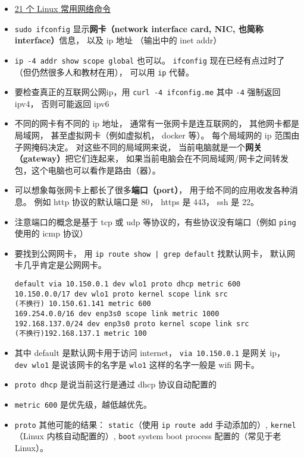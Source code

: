 
\begin{itemize}
\item \href{https://itsfoss.com/basic-linux-networking-commands/}{21 个 Linux 常用网络命令}
\item \verb`sudo ifconfig` 显示\textbf{网卡（network interface card, NIC, 也简称 interface）}信息， 以及 ip 地址 （输出中的 inet addr）
\item \verb`ip -4 addr show scope global` 也可以。 \verb`ifconfig` 现在已经有点过时了（但仍然很多人和教材在用）， 可以用 \verb`ip` 代替。
\item 要检查真正的互联网公网ip，用 \verb`curl -4 ifconfig.me` 其中 \verb`-4` 强制返回 ipv4， 否则可能返回 ipv6
\item 不同的网卡有不同的 ip 地址， 通常有一张网卡是连互联网的， 其他网卡都是局域网， 甚至虚拟网卡（例如虚拟机， docker 等）。 每个局域网的 ip 范围由子网掩码决定。 对这些不同的局域网来说， 当前电脑就是一个\textbf{网关（gateway）}把它们连起来， 如果当前电脑会在不同局域网/网卡之间转发包，这个电脑也可以看作是路由（器）。
\item 可以想象每张网卡上都长了很多\textbf{端口（port）}， 用于给不同的应用收发各种消息。 例如 http 协议的默认端口是 80， https 是 443， ssh 是 22。
\item 注意端口的概念是基于 tcp 或 udp 等协议的，有些协议没有端口（例如 \verb`ping` 使用的 icmp 协议）
\item 要找到公网网卡， 用 \verb`ip route show | grep default` 找默认网卡， 默认网卡几乎肯定是公网网卡。
\begin{lstlisting}[language=none]
default via 10.150.0.1 dev wlo1 proto dhcp metric 600
10.150.0.0/17 dev wlo1 proto kernel scope link src
(不换行) 10.150.61.141 metric 600
169.254.0.0/16 dev enp3s0 scope link metric 1000
192.168.137.0/24 dev enp3s0 proto kernel scope link src
(不换行)192.168.137.1 metric 100
\end{lstlisting}
\item 其中 default 是默认网卡用于访问 internet， \verb`via 10.150.0.1` 是网关 ip， \verb`dev wlo1` 是说该网卡的名字是 \verb`wlo1` 这样的名字一般是 wifi 网卡。
\item \verb`proto dhcp` 是说当前这行是通过 dhcp 协议自动配置的
\item \verb`metric 600` 是优先级，越低越优先。
\item \verb`proto` 其他可能的结果： \verb`static`（使用 \verb`ip route add` 手动添加的）, \verb`kernel`（Linux 内核自动配置的）, \verb`boot` system boot process 配置的（常见于老 Linux）。

\end{itemize}
